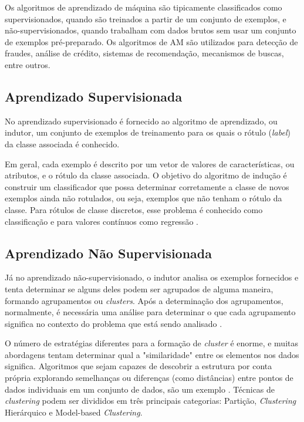 Os algoritmos de aprendizado de máquina são tipicamente classificados como supervisionados, quando são treinados a partir de um conjunto de exemplos, e não-supervisionados, quando trabalham com dados brutos sem usar um conjunto de exemplos pré-preparado.
Os algoritmos de AM são utilizados para detecção de fraudes, análise de crédito, sistemas de recomendação, mecanismos de buscas, entre outros.



\subsection{Aprendizado Supervisionada}


No aprendizado supervisionado é fornecido ao algoritmo de aprendizado, ou indutor, um conjunto de exemplos de treinamento para os quais o rótulo (\textit{label}) da classe associada é conhecido.

Em geral, cada exemplo é descrito por um vetor de valores de características, ou atributos, e o rótulo da classe associada. O objetivo do algoritmo de indução é construir um classificador que possa determinar corretamente a classe de novos exemplos ainda não rotulados, ou seja, exemplos que não tenham o rótulo da classe. Para rótulos de classe discretos, esse problema é conhecido como classificação e para valores contínuos como regressão \cite{monard2003}. 



\subsection{Aprendizado Não Supervisionada}

Já no aprendizado não-supervisionado, o indutor analisa os exemplos fornecidos e tenta determinar se alguns deles podem ser agrupados de alguma maneira, formando agrupamentos ou \textit{clusters}. Após a determinação dos agrupamentos, normalmente, é necessária uma análise para determinar o que cada agrupamento significa no contexto do problema que está sendo analisado \cite{monard2003}.



O número de estratégias diferentes para a formação de \textit{cluster} é enorme, e muitas abordagens tentam determinar qual a "similaridade" entre os elementos nos dados significa. Algoritmos que sejam capazes de descobrir a estrutura por conta própria explorando semelhanças ou diferenças (como distâncias) entre pontos de dados individuais em um conjunto de dados, são um exemplo \cite{cios2007}. Técnicas de \textit{clustering} podem ser divididos em três principais categorias: Partição, \textit{Clustering} Hierárquico e Model-based \textit{Clustering}.



